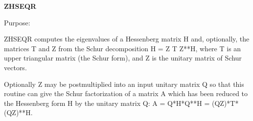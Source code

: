 {\bfseries Z\+H\+S\+E\+Q\+R} 

 \begin{DoxyParagraph}{Purpose\+: }
\begin{DoxyVerb}    ZHSEQR computes the eigenvalues of a Hessenberg matrix H
    and, optionally, the matrices T and Z from the Schur decomposition
    H = Z T Z**H, where T is an upper triangular matrix (the
    Schur form), and Z is the unitary matrix of Schur vectors.

    Optionally Z may be postmultiplied into an input unitary
    matrix Q so that this routine can give the Schur factorization
    of a matrix A which has been reduced to the Hessenberg form H
    by the unitary matrix Q:  A = Q*H*Q**H = (QZ)*T*(QZ)**H.\end{DoxyVerb}
 
\end{DoxyParagraph}

